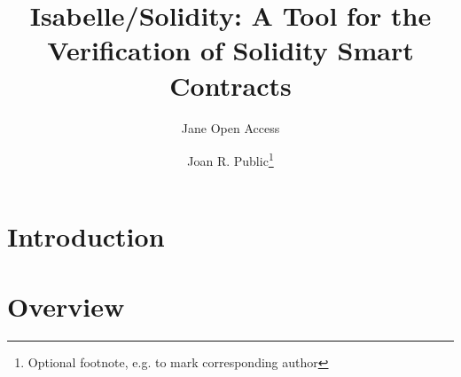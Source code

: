 \documentclass[a4paper,UKenglish,cleveref, autoref, thm-restate]{oasics-v2021}
\title{Isabelle/Solidity: A Tool  for the Verification of Solidity Smart Contracts} %
\author{Jane {Open Access}}{Dummy University Computing Laboratory, [optional: Address], Country \and My second affiliation, Country \and \url{http://www.myhomepage.edu} }{johnqpublic@dummyuni.org}{https://orcid.org/0000-0002-1825-0097}{(Optional) author-specific funding acknowledgements}%
\author{Joan R. Public\footnote{Optional footnote, e.g. to mark corresponding author}}{Department of Informatics, Dummy College, [optional: Address], Country}{joanrpublic@dummycollege.org}{[orcid]}{[funding]}
\begin{document}
\maketitle

\begin{abstract}

\end{abstract}

\section{Introduction}
\label{sec-intro}

\section{Overview}
\end{document}
